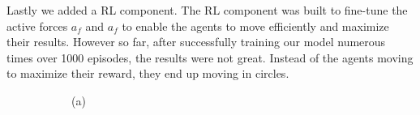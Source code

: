 \documentclass[9pt]{pnas-new}
\begin{document}
Lastly we added a RL component. The RL component was built to fine-tune the active forces $a_f$ and $a_f$ to enable the agents to move efficiently and maximize their results. 
However so far, after successfully training our model numerous times over 1000 episodes, the results were not great. Instead of the agents moving to maximize their reward, they end up moving in circles.

\begin{figure}[ht]
	\centering
	\begin{subfigure}{0.30\textwidth}
		\centering
		\vspace{0.5em}
		\centering (a)
	\end{subfigure}
	\hfill
	\begin{subfigure}{0.30\textwidth}
		\centering

\end{subfigure}
\end{figure}
\end{document}
